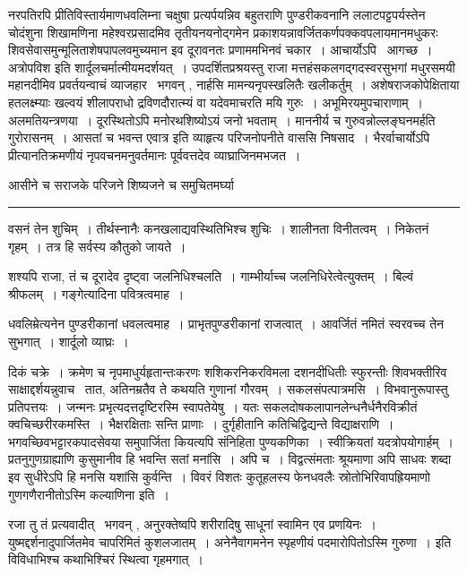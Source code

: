 \documentclass[11pt, openany]{book}
\begin{document}
नरपतिरपि प्रीतिविस्तार्यमाणधवलिम्ना चक्षुषा प्रत्यर्पयन्निव बहुतराणि पुण्डरीकवनानि ललाटपट्टपर्यस्तेन चोदंशुना शिखामणिना महेश्वरप्रसादमिव तृतीयनयनोद्गमेन प्रकाशयन्नावर्जितकर्णपक्कवपलायमानमधुकरः शिवसेवासमुन्मूलिताशेषपापलवमुच्यमान इव दूरावनतः प्रणाममभिनवं चकार~। आचार्योऽपि \textendash\ {\haq आगच्छ~। अत्रोपविश} इति शार्दूलचर्मात्मीयमदर्शयत्~। उपदर्शितप्रश्रयस्तु राजा मत्तहंसकलगद्गदस्वरसुभगां मधुरसमयी महानदीमिव प्रवर्तयन्वाचं व्याजहार \textendash\ भगवन् , नार्हसि मामन्यनृपस्खलितैः खलीकर्तुम्~। अशेषराजकोपेक्षिताया हतलक्ष्म्याः खल्वयं शीलापराधो द्रविणदौरात्म्यं वा यदेवमाचरति मयि गुरुः~। अभूमिरयमुपचाराणाम्~। अलमतियन्त्रणया~। दूरस्थितोऽपि मनोरथशिष्योऽयं जनो भवताम्~। माननीर्य च गुरुवन्नोल्लङ्घनमर्हति गुरोरासनम्~। आसतां च भवन्त एवात्र इति व्याहृत्य परिजनोपनीते वाससि निषसाद~। भैरर्वाचार्योऽपि प्रीत्यानतिक्रमणीयं नृपवचनमनुवर्तमानः पूर्ववत्तदेव व्याघ्राजिनमभजत~।

आसीने च सराजके परिजने शिष्यजने च समुचितमर्घ्या\textendash

\vspace{2mm}
\hrule

\noindent
{\s वसनं तेन शुचिम्~। तीर्थस्नानैः कनखलाद्यवस्थितिभिश्च शुचिः~। शालीनता विनीतत्वम्~। निकेतनं गृहम्~। तत्र हि सर्वस्य कौतुको जायते~।

शश्यपि राजा, तं च दूरादेव दृष्ट्वा जलनिधिश्चलति~। गाम्भीर्याच्च जलनिधिरेत्वेत्युक्तम्~। बिल्वं श्रीफलम्~। गङ्गेत्यादिना पवित्रत्वमाह~।

धवलिम्रेत्यनेन पुण्डरीकानां धवलत्वमाह~। प्राभृतपुण्डरीकानां राजत्वात्~। आवर्जितं नमितं स्वरवच्च तेन सुभगात्~। शार्दूलो व्याघ्रः~।}


\newpage
\lfoot{}

\noindent
दिकं चक्रे~। क्रमेण च नृपमाधुर्यहृतान्तःकरणः शशिकरनिकरविमला दशनदीधितीः स्फुरन्तीः शिवभक्तीरिव साक्षाद्दर्शयन्नुवाच \textendash\ तात, अतिनम्रतैव ते कथयति गुणानां गौरवम्~। सकलसंपत्पात्रमसि~। विभवानुरूपास्तु प्रतिपत्तयः~। जन्मनः प्रभृत्यदत्तदृष्टिरस्मि स्वापतेयेषु~। यतः सकलदोषकलापानलेन्धनैर्धनैरविक्रीतं क्वचिच्छरीरकमस्ति~। भैक्षरक्षिताः सन्ति प्राणाः~। दुर्गृहीतानि कतिचिद्विद्यन्ते विद्याक्षराणि~। भगवच्छिवभट्टारकपादसेवया समुपार्जिता कियत्यपि संनिहिता पुण्यकणिका~। स्वीक्रियतां यदत्रोपयोगार्हम्~। प्रतनुगुणग्राह्याणि कुसुमानीव हि भवन्ति सतां मनांसि~। अपि च~। विद्वत्संमताः श्रूयमाणा अपि साधवः शब्दा इव सुधीरेऽपि हि मनसि यशांसि कुर्वन्ति~। विवरं विशतः कुतूहलस्य फेनधवलैः स्रोतोभिरिवापह्रियमाणो गुणगणैरानीतोऽस्मि कल्याणिना इति~।

रजा तु तं प्रत्यवादीत् \textendash\ भगवन् , अनुरक्तेष्वपि शरीरादिषु साधूनां स्वामिन एव प्रणयिनः~। युष्मद्दर्शनादुपार्जितमेव चापरिमितं कुशलजातम्~। अनेनैवागमनेन स्पृहणीयं पदमारोपितोऽस्मि गुरुणा~। इति विविधाभिश्च कथाभिश्चिरं स्थित्वा गृहमगात्~।
\end{document}
